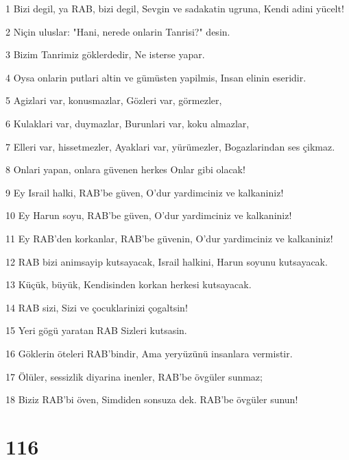 \par 1 Bizi degil, ya RAB, bizi degil, Sevgin ve sadakatin ugruna, Kendi adini yücelt!
\par 2 Niçin uluslar: "Hani, nerede onlarin Tanrisi?" desin.
\par 3 Bizim Tanrimiz göklerdedir, Ne isterse yapar.
\par 4 Oysa onlarin putlari altin ve gümüsten yapilmis, Insan elinin eseridir.
\par 5 Agizlari var, konusmazlar, Gözleri var, görmezler,
\par 6 Kulaklari var, duymazlar, Burunlari var, koku almazlar,
\par 7 Elleri var, hissetmezler, Ayaklari var, yürümezler, Bogazlarindan ses çikmaz.
\par 8 Onlari yapan, onlara güvenen herkes Onlar gibi olacak!
\par 9 Ey Israil halki, RAB'be güven, O'dur yardimciniz ve kalkaniniz!
\par 10 Ey Harun soyu, RAB'be güven, O'dur yardimciniz ve kalkaniniz!
\par 11 Ey RAB'den korkanlar, RAB'be güvenin, O'dur yardimciniz ve kalkaniniz!
\par 12 RAB bizi animsayip kutsayacak, Israil halkini, Harun soyunu kutsayacak.
\par 13 Küçük, büyük, Kendisinden korkan herkesi kutsayacak.
\par 14 RAB sizi, Sizi ve çocuklarinizi çogaltsin!
\par 15 Yeri gögü yaratan RAB Sizleri kutsasin.
\par 16 Göklerin öteleri RAB'bindir, Ama yeryüzünü insanlara vermistir.
\par 17 Ölüler, sessizlik diyarina inenler, RAB'be övgüler sunmaz;
\par 18 Biziz RAB'bi öven, Simdiden sonsuza dek. RAB'be övgüler sunun!

\chapter{116}

